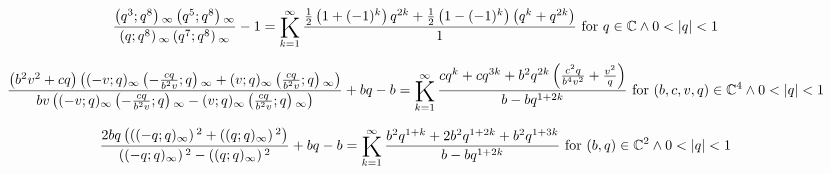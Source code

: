 \documentclass{article}
\newcommand{\bigK}{\mathop{\raisebox{-5pt}{\huge K}}}
\begin{document}
\[\frac{\left(q^3;q^8\right){}_{\infty } \left(q^5;q^8\right){}_{\infty }}{\left(q;q^8\right){}_{\infty } \left(q^7;q^8\right){}_{\infty }}-1=\bigK_{k=1}^{\infty}\frac{\frac{1}{2} \left(1+(-1)^k\right) q^{2 k}+\frac{1}{2} \left(1-(-1)^k\right) \left(q^k+q^{2 k}\right)}{1}\text{ for }q\in \mathbb{C}\land 0<\left| q\right| <1\] 

\[\frac{\left(b^2 v^2+c q\right) \left((-v;q)_{\infty } \left(-\frac{c q}{b^2 v};q\right){}_{\infty }+(v;q)_{\infty } \left(\frac{c q}{b^2 v};q\right){}_{\infty }\right)}{b v \left((-v;q)_{\infty } \left(-\frac{c q}{b^2 v};q\right){}_{\infty }-(v;q)_{\infty } \left(\frac{c q}{b^2 v};q\right){}_{\infty }\right)}+b q-b=\bigK_{k=1}^{\infty}\frac{c q^k+c q^{3 k}+b^2 q^{2 k} \left(\frac{c^2 q}{b^4 v^2}+\frac{v^2}{q}\right)}{b-b q^{1+2 k}}\text{ for }(b,c,v,q)\in \mathbb{C}^4\land 0<\left| q\right| <1\] 

\[\frac{2 b q \left(\left((-q;q)_{\infty }\right){}^2+\left((q;q)_{\infty }\right){}^2\right)}{\left((-q;q)_{\infty }\right){}^2-\left((q;q)_{\infty }\right){}^2}+b q-b=\bigK_{k=1}^{\infty}\frac{b^2 q^{1+k}+2 b^2 q^{1+2 k}+b^2 q^{1+3 k}}{b-b q^{1+2 k}}\text{ for }(b,q)\in \mathbb{C}^2\land 0<\left| q\right| <1\] 
\end{document}
